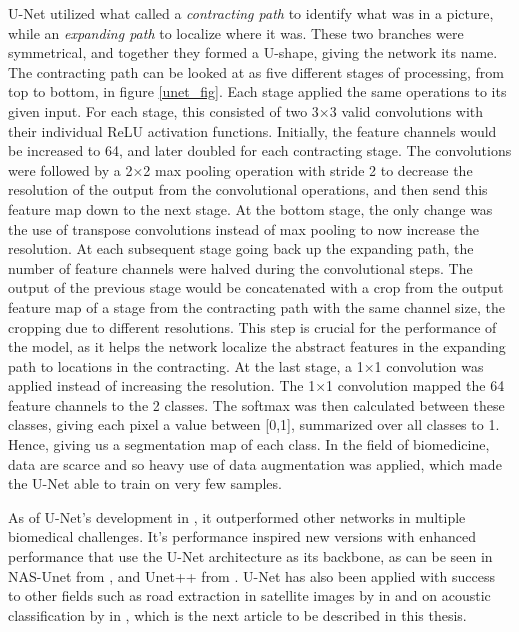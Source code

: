     U-Net utilized what \citeauthor{unet_ronneberger2015}\cite{unet_ronneberger2015} called a \textit{contracting path} to identify what was in a picture, while an \textit{expanding path} to localize where it was. These two branches were symmetrical, and together they formed a U-shape, giving the network its name. The contracting path can be looked at as five different stages of processing, from top to bottom, in figure \ref{unet_fig}. Each stage applied the same operations to its given input. For each stage, this consisted of two 3×3 valid convolutions with their individual ReLU activation functions. Initially, the feature channels would be increased to 64, and later doubled for each contracting stage. The convolutions were followed by a 2×2 max pooling operation with stride 2 to decrease the resolution of the output from the convolutional operations, and then send this feature map down to the next stage. At the bottom stage, the only change was the use of transpose convolutions instead of max pooling to now increase the resolution. At each subsequent stage going back up the expanding path, the number of feature channels were halved during the convolutional steps. The output of the previous stage would be concatenated with a crop from the output feature map of a stage from the contracting path with the same channel size, the cropping due to different resolutions. This step is crucial for the performance of the model, as it helps the network localize the abstract features in the expanding path to locations in the contracting. At the last stage, a 1×1 convolution was applied instead of increasing the resolution. The 1×1 convolution mapped the 64 feature channels to the 2 classes. The softmax was then calculated between these classes, giving each pixel a value between [0,1], summarized over all classes to 1. Hence, giving us a segmentation map of each class. In the field of biomedicine, data are scarce and so heavy use of data augmentation was applied, which made the U-Net able to train on very few samples.
    
    As of U-Net's development in \citeyear{unet_ronneberger2015}, it outperformed other networks in multiple biomedical challenges\cite{unet_ronneberger2015}. It's performance inspired new versions with enhanced performance that use the U-Net architecture as its backbone, as can be seen in NAS-Unet\cite{weng2019unet} from \citeyear{weng2019unet}, and Unet++\cite{zhou2018unet} from \citeyear{zhou2018unet}. U-Net has also been applied with success to other fields such as road extraction in satellite images by \citeauthor{zhang2018road}\cite{zhang2018road} in \citeyear{zhang2018road} and on acoustic classification by \citeauthor{brautaset2020acoustic}\cite{brautaset2020acoustic} in \citeyear{brautaset2020acoustic}, which is the next article to be described in this thesis.
    
